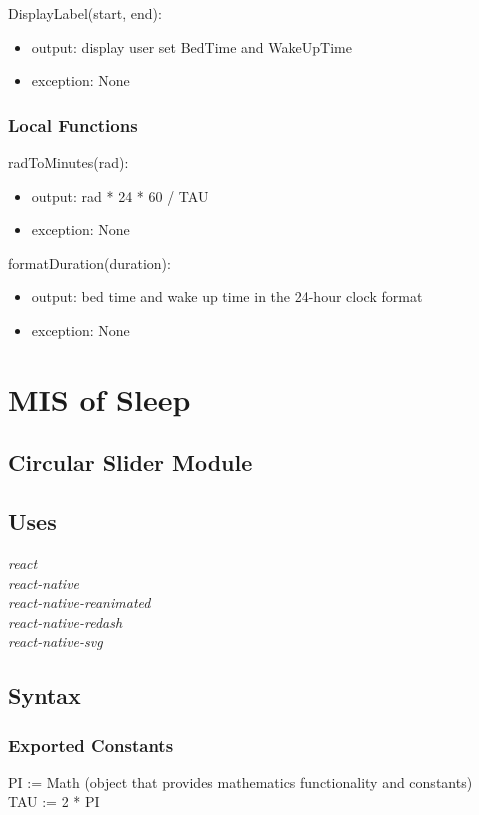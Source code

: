 \documentclass[12pt, titlepage]{article}
\begin{document}
\noindent DisplayLabel(start, end):
\begin{itemize}
	\item output: display user set BedTime and WakeUpTime
	\item exception: None
\end{itemize}

\subsubsection{Local Functions}

\noindent radToMinutes(rad):
\begin{itemize}
	\item output: rad * 24 * 60 / TAU
	\item exception: None 
\end{itemize}

\noindent formatDuration(duration):
\begin{itemize}
	\item output: bed time and wake up time in the 24-hour clock format
	\item exception: None 
\end{itemize}

\section{MIS of Sleep} \label{Module} 

\subsection{Circular Slider Module}

\subsection{Uses}
{\textit{react}}\\
{\textit{react-native}}\\
{\textit{react-native-reanimated}}\\
{\textit{react-native-redash}}\\
{\textit{react-native-svg}}

\subsection{Syntax}

\subsubsection{Exported Constants}
PI := Math (object that provides mathematics functionality and constants)\\
TAU := 2 * PI
\end{document}
